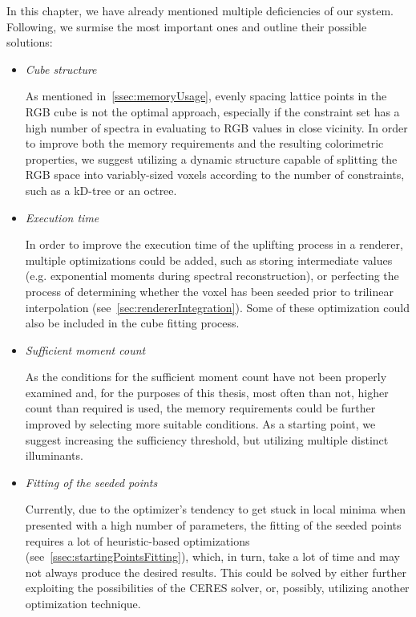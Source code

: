 In this chapter, we have already mentioned multiple deficiencies of our system. Following, we surmise the most important ones and outline their possible solutions:
\begin{itemize}
	\item{\emph{Cube structure}}
	
	As mentioned in~\cref{ssec:memoryUsage}, evenly spacing lattice points in the RGB cube is not the optimal approach, especially if the constraint set has a high number of spectra in evaluating to RGB values in close vicinity. In order to improve both the memory requirements and the resulting colorimetric properties, we suggest utilizing a dynamic structure capable of splitting the RGB space into variably-sized voxels according to the number of constraints, such as a kD-tree or an octree.
	
	\item{\emph{Execution time}}
	
	In order to improve the execution time of the uplifting process in a renderer, multiple optimizations could be added, such as storing intermediate values (e.g. exponential moments during spectral reconstruction), or perfecting the process of determining whether the voxel has been seeded prior to trilinear interpolation (see~\cref{sec:rendererIntegration}). Some of these optimization could also be included in the cube fitting process.
	
	\item{\emph{Sufficient moment count}}
	
	As the conditions for the sufficient moment count have not been properly examined and, for the purposes of this thesis, most often than not, higher count than required is used, the memory requirements could be further improved by selecting more suitable conditions. As a starting point, we suggest increasing the sufficiency threshold, but utilizing multiple distinct illuminants.
	
	\item{\emph{Fitting of the seeded points}}
	
	Currently, due to the optimizer's tendency to get stuck in local minima when presented with a high number of parameters, the fitting of the seeded points requires a lot of heuristic-based optimizations (see~\cref{ssec:startingPointsFitting}), which, in turn, take a lot of time and may not always produce the desired results. This could be solved by either further exploiting the possibilities of the CERES solver, or, possibly, utilizing another optimization technique.


\end{itemize}
